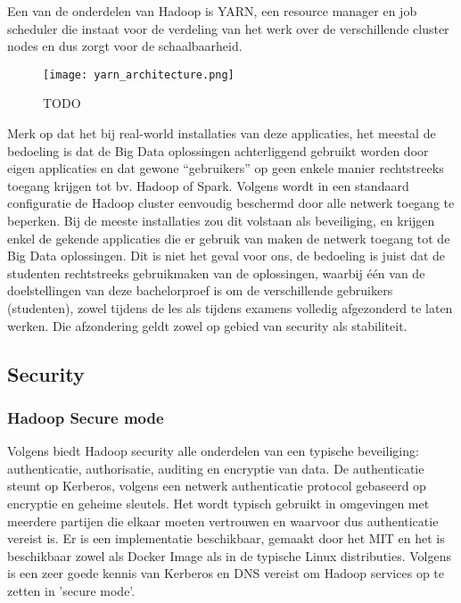 Een van de onderdelen van Hadoop is YARN, een resource manager en job scheduler die instaat voor de verdeling van het werk over de verschillende cluster nodes en dus zorgt voor de schaalbaarheid.
\newline
\begin{figure}
    \texttt{[image: yarn\_architecture.png]}
    \caption{TODO \autocite{Hadoop2023d}}
\end{figure}

Merk op dat het bij real-world installaties van deze applicaties, het meestal de bedoeling is dat de Big Data oplossingen achterliggend gebruikt worden door eigen applicaties en dat gewone ``gebruikers'' op geen enkele manier rechtstreeks toegang krijgen tot bv. Hadoop of Spark.
\newline
Volgens \autocite{Hadoop2023} wordt in een standaard configuratie de Hadoop cluster eenvoudig beschermd door alle netwerk toegang te beperken. 
Bij de meeste installaties zou dit volstaan als beveiliging, en krijgen enkel de gekende applicaties die er gebruik van maken de netwerk toegang tot de Big Data oplossingen.
\newline
\newline
Dit is niet het geval voor ons, de bedoeling is juist dat de studenten rechtstreeks gebruikmaken van de oplossingen, waarbij één van de doelstellingen van deze bachelorproef is om de verschillende gebruikers (studenten), zowel tijdens de les als tijdens examens volledig afgezonderd te laten werken. Die afzondering geldt zowel op gebied van security als stabiliteit.

\subsection{Security}

\subsubsection{Hadoop Secure mode}
Volgens \textcite{Kiran2022} biedt Hadoop security alle onderdelen van een typische beveiliging: authenticatie, authorisatie, auditing en encryptie van data.
De authenticatie steunt op Kerberos, volgens \textcite{Kerberos2023} een netwerk authenticatie protocol gebaseerd op encryptie en geheime sleutels. Het wordt typisch gebruikt in omgevingen met meerdere partijen die elkaar moeten vertrouwen en waarvoor dus authenticatie vereist is. Er is een implementatie beschikbaar, gemaakt door het MIT en het is beschikbaar zowel als Docker Image als in de typische Linux distributies.
\newline
Volgens \textcite{Hadoop2023} is een zeer goede kennis van Kerberos en DNS vereist om Hadoop services op te zetten in 'secure mode'.
\newline
\newline

